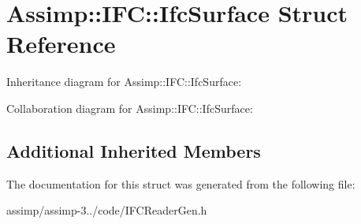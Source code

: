 \hypertarget{struct_assimp_1_1_i_f_c_1_1_ifc_surface}{\section{Assimp\+:\+:I\+F\+C\+:\+:Ifc\+Surface Struct Reference}
\label{struct_assimp_1_1_i_f_c_1_1_ifc_surface}
}


Inheritance diagram for Assimp\+:\+:I\+F\+C\+:\+:Ifc\+Surface\+:


Collaboration diagram for Assimp\+:\+:I\+F\+C\+:\+:Ifc\+Surface\+:
\subsection*{Additional Inherited Members}


The documentation for this struct was generated from the following file\+:\begin{DoxyCompactItemize}
\item 
assimp/assimp-\/3../code/I\+F\+C\+Reader\+Gen.\+h\end{DoxyCompactItemize}
